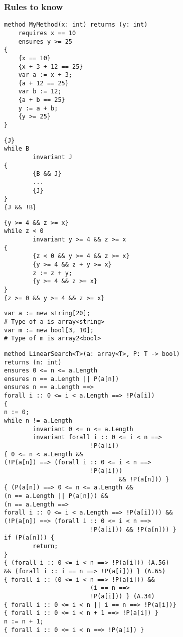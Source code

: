 \subsubsection{Rules to know}

\begin{verbatim}
method MyMethod(x: int) returns (y: int)
    requires x == 10
    ensures y >= 25
{
    {x == 10}
    {x + 3 + 12 == 25}
    var a := x + 3;
    {a + 12 == 25}
    var b := 12;
    {a + b == 25}
    y := a + b;
    {y >= 25}
}

\end{verbatim}


\begin{verbatim}
{J}
while B
        invariant J
{
        {B && J}
        ... 
        {J}
}
{J && !B}
\end{verbatim}

\begin{verbatim}
{y >= 4 && z >= x}
while z < 0
        invariant y >= 4 && z >= x
{
        {z < 0 && y >= 4 && z >= x}
        {y >= 4 && z + y >= x}
        z := z + y;
        {y >= 4 && z >= x}
}
{z >= 0 && y >= 4 && z >= x}
\end{verbatim}

\begin{verbatim}
var a := new string[20];
# Type of a is array<string>
var m := new bool[3, 10];
# Type of m is array2<bool>

\end{verbatim}
\begin{verbatim}
method LinearSearch<T>(a: array<T>, P: T -> bool)
returns (n: int)
ensures 0 <= n <= a.Length
ensures n == a.Length || P(a[n])
ensures n == a.Length ==>
forall i :: 0 <= i < a.Length ==> !P(a[i])
{
n := 0;
while n != a.Length
        invariant 0 <= n <= a.Length
        invariant forall i :: 0 <= i < n ==>
                        !P(a[i])
{ 0 <= n < a.Length &&
(!P(a[n]) ==> (forall i :: 0 <= i < n ==>
                        !P(a[i])) 
                                && !P(a[n])) }
{ (P(a[n]) ==> 0 <= n <= a.Length &&
(n == a.Length || P(a[n])) &&
(n == a.Length ==>
forall i :: 0 <= i < a.Length ==> !P(a[i]))) &&
(!P(a[n]) ==> (forall i :: 0 <= i < n ==> 
                        !P(a[i])) && !P(a[n])) }
if (P(a[n])) {
        return;
}
{ (forall i :: 0 <= i < n ==> !P(a[i])) (A.56)
&& (forall i :: i == n ==> !P(a[i])) } (A.65)
{ forall i :: (0 <= i < n ==> !P(a[i])) &&
                        (i == n ==>
                        !P(a[i])) } (A.34)
{ forall i :: 0 <= i < n || i == n ==> !P(a[i])}
{ forall i :: 0 <= i < n + 1 ==> !P(a[i]) }
n := n + 1;
{ forall i :: 0 <= i < n ==> !P(a[i]) }
\end{verbatim}


